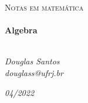 \begin{titlepage}
   \begin{center}
      \textsc{\Large Notas em matemática}\\[0.5cm]

      \LinhaR \\[0.4cm]
         { \LARGE \bfseries Algebra \\[0.4cm]}
      \LinhaR \\[1.4cm]

      \noindent
      \begin{minipage}{0.4\textwidth}
         \begin{center} \large
            \emph{Douglas Santos}\\
            \itshape{douglass@ufrj.br}
         \end{center}
      \end{minipage}

      \begin{center}
      \end{center}
      \vfill
      {\large \textit{04/2022}}
   \end{center}
\end{titlepage}
\clearpage
